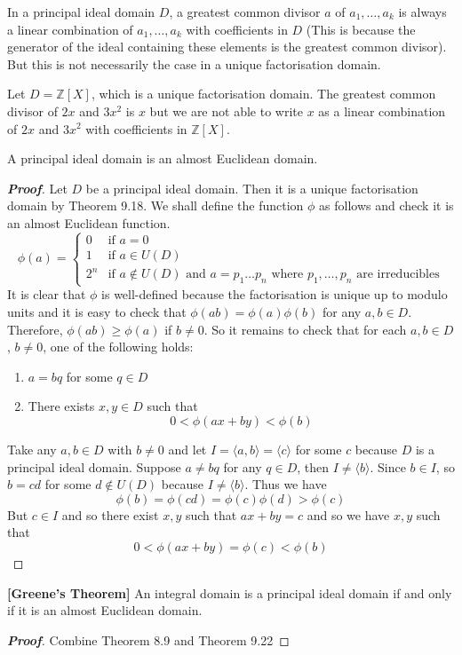 In a principal ideal domain $D$, a greatest common divisor $a$ of $a_1,\ldots,a_k$ is always
a linear combination of $a_1,\ldots,a_k$ with coefficients in $D$ (This is because the generator of the ideal containing these elements is the greatest common divisor). But this is not necessarily the case in a unique factorisation domain.
\begin{example} Let $D=\mathbb{Z}[X]$, which is a unique factorisation domain. The greatest common divisor of $2x$ and $3x^2$ is $x$ but we are not able to write $x$ as a linear combination of $2x$ and $3x^2$ with coefficients in $\mathbb{Z}[X]$.
\end{example}
\begin{theorem} A principal ideal domain is an almost Euclidean domain.
\end{theorem}
\begin{proof}[\bf Proof] Let $D$ be a principal ideal domain. Then it is a unique factorisation domain by Theorem
9.18. We shall define the function $\phi$ as follows and check it is an almost Euclidean function.
\begin{equation*}
\phi(a)= \left\{
\begin{array}{ll}
0 & \text{if } a=0\\
1 & \text{if } a \in U(D)\\
2^n &\text{if } a \not \in U(D) \text{ and } a=p_1\ldots p_n \text{ where } p_1,\ldots,p_n \text{ are irreducibles}
\end{array} \right.
\end{equation*}
It is clear that $\phi$ is well-defined because the factorisation is unique up to modulo units and it is easy to check that $\phi(ab)=\phi(a)\phi(b)$ for any $a,b \in D$. Therefore, $\phi(ab) \ge \phi(a)$ if
$b \neq 0$. So it remains to check that for each $a,b \in D$, $b \neq 0$, one of the following holds:
\begin{enumerate}
\item $a=bq$ for some $q \in D$
\item There exists $x,y \in D$ such that
$$0<\phi(ax+by)<\phi(b)$$
\end{enumerate}
Take any $a,b \in D$ with $b \neq 0$ and let $I=\langle a,b \rangle=\langle c \rangle$ for some $c$ because $D$ is a principal ideal domain. Suppose $a \neq bq$ for any $q \in D$, then $I \neq \langle b\rangle$.
Since $b \in I$, so $b=cd$ for some $d \not \in U(D)$ because $I \neq \langle b\rangle$. Thus we have
$$\phi(b)=\phi(cd)=\phi(c)\phi(d)>\phi(c)$$
But $c \in I$ and so there exist $x,y$ such that $ax+by=c$ and so we have $x,y$ such that
$$0<\phi(ax+by)=\phi(c)<\phi(b)$$
\end{proof}
\begin{theorem}{\bf [Greene's Theorem]}\label{G;Greene} An integral domain is a principal ideal domain if and only if it is an almost Euclidean domain.
\end{theorem}
\begin{proof}[\bf Proof] Combine Theorem 8.9 and Theorem 9.22
\end{proof}
